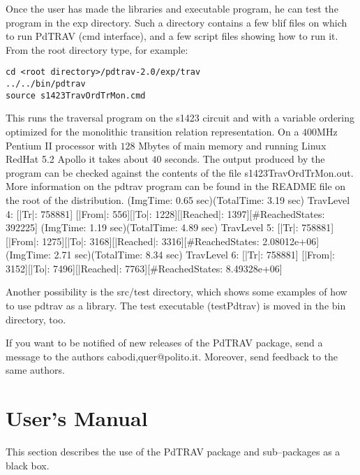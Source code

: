 Once the user has made the libraries and executable program, he can test
the program in the {\sf exp} directory.
Such a directory contains a few {\sf blif} files on which to run
PdTRAV (cmd interface), and
a few script files showing how to run it.
From the root directory type, for example:
\begin{verbatim}
cd <root directory>/pdtrav-2.0/exp/trav
../../bin/pdtrav
source s1423TravOrdTrMon.cmd
\end{verbatim}
This runs the traversal program on the {\sf s1423} circuit and with a
variable ordering optimized for the monolithic transition relation
representation.
On a $400$MHz Pentium II processor with $128$ Mbytes of main memory and
running Linux RedHat 5.2 Apollo it takes about $40$ seconds.
The output produced by the program can be checked against the contents of
the file s1423TravOrdTrMon.out.
More information on the pdtrav program can be found in the README file on
the root of the distribution. 
(ImgTime: 0.65 sec)(TotalTime: 3.19 sec)
TravLevel 4: [|Tr|: 758881] [|From|: 556][|To|: 1228][|Reached|: 1397][\#ReachedStates: 392225]
(ImgTime: 1.19 sec)(TotalTime: 4.89 sec)
TravLevel 5: [|Tr|: 758881] [|From|: 1275][|To|: 3168][|Reached|: 3316][\#ReachedStates: 2.08012e+06]
(ImgTime: 2.71 sec)(TotalTime: 8.34 sec)
TravLevel 6: [|Tr|: 758881] [|From|: 3152][|To|: 7496][|Reached|: 7763][\#ReachedStates: 8.49328e+06]

Another possibility is the {\sf src/test} directory, which shows some
examples of how to use pdtrav as a library. The {\sf test} executable
(testPdtrav) is moved in the bin directory, too.

If you want to be notified of new releases of the PdTRAV package, send a 
message to the authors {cabodi,quer}@polito.it.
Moreover, send feedback to the same authors.
 

\section{User's Manual} 

This section describes the use of the PdTRAV package and sub--packages as a
black box. 


